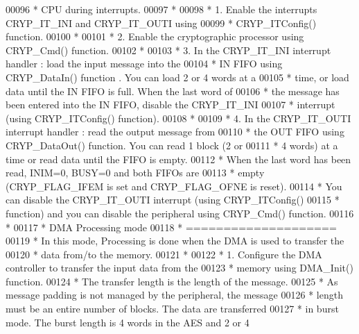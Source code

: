 \begin{DoxyCode}
00096 \textcolor{comment}{  *    CPU during interrupts.}
00097 \textcolor{comment}{  *}
00098 \textcolor{comment}{  *    1. Enable the interrupts CRYP\_IT\_INI and CRYP\_IT\_OUTI using }
00099 \textcolor{comment}{  *       CRYP\_ITConfig() function.}
00100 \textcolor{comment}{  *}
00101 \textcolor{comment}{  *    2. Enable the cryptographic processor using CRYP\_Cmd() function.}
00102 \textcolor{comment}{  *}
00103 \textcolor{comment}{  *    3. In the CRYP\_IT\_INI interrupt handler : load the input message into the }
00104 \textcolor{comment}{  *       IN FIFO using CRYP\_DataIn() function . You can load 2 or 4 words at a }
00105 \textcolor{comment}{  *       time, or load data until the IN FIFO is full. When the last word of}
00106 \textcolor{comment}{  *       the message has been entered into the IN FIFO, disable the CRYP\_IT\_INI }
00107 \textcolor{comment}{  *       interrupt (using CRYP\_ITConfig() function).}
00108 \textcolor{comment}{  *}
00109 \textcolor{comment}{  *    4. In the CRYP\_IT\_OUTI interrupt handler : read the output message from }
00110 \textcolor{comment}{  *       the OUT FIFO using CRYP\_DataOut() function. You can read 1 block (2 or }
00111 \textcolor{comment}{  *       4 words) at a time or read data until the FIFO is empty.}
00112 \textcolor{comment}{  *       When the last word has been read, INIM=0, BUSY=0 and both FIFOs are }
00113 \textcolor{comment}{  *       empty (CRYP\_FLAG\_IFEM is set and CRYP\_FLAG\_OFNE is reset). }
00114 \textcolor{comment}{  *       You can disable the CRYP\_IT\_OUTI interrupt (using CRYP\_ITConfig() }
00115 \textcolor{comment}{  *       function) and you can disable the peripheral using CRYP\_Cmd() function.}
00116 \textcolor{comment}{  *}
00117 \textcolor{comment}{  *    DMA Processing mode }
00118 \textcolor{comment}{  *    ====================}
00119 \textcolor{comment}{  *    In this mode, Processing is done when the DMA is used to transfer the }
00120 \textcolor{comment}{  *    data from/to the memory.}
00121 \textcolor{comment}{  *}
00122 \textcolor{comment}{  *    1. Configure the DMA controller to transfer the input data from the }
00123 \textcolor{comment}{  *       memory using DMA\_Init() function. }
00124 \textcolor{comment}{  *       The transfer length is the length of the message. }
00125 \textcolor{comment}{  *       As message padding is not managed by the peripheral, the message }
00126 \textcolor{comment}{  *       length must be an entire number of blocks. The data are transferred }
00127 \textcolor{comment}{  *       in burst mode. The burst length is 4 words in the AES and 2 or 4 }

\end{DoxyCode}
